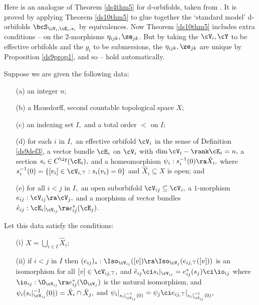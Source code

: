 \documentclass{article}
\begin{document}
Here is an analogue of Theorem \ref{ds4thm5} for d-orbifolds, taken
from \cite[\S 10.2]{Joyc6}. It is proved by applying Theorem
\ref{ds10thm5} to glue together the `standard model' d-orbifolds
$\bcS_{\cV_i,\cE_i,s_i}$ by equivalences. Now Theorem \ref{ds10thm5}
includes extra conditions -- on the
2-morphisms $\eta_{ijk},\ze_{jk}$. But by taking the $\cV_i,\cY$ to
be effective orbifolds and the $g_i$ to be submersions, the
$\eta_{ijk},\ze_{jk}$ are unique by Proposition \ref{ds9prop1}, and
so -- hold
automatically.

\begin{thm} Suppose we are given the following data:
\begin{itemize}
\setlength{\itemsep}{0pt}
\setlength{\parsep}{0pt}
\item[{\rm(a)}] an integer $n;$
\item[{\rm(b)}] a Hausdorff, second countable topological space $X;$
\item[{\rm(c)}] an indexing set\/ $I,$ and a total order $<$ on $I;$
\item[{\rm(d)}] for each\/ $i$ in $I,$ an effective orbifold\/
$\cV_i$ in the sense of Definition\/ {\rm\ref{ds9def3},} a
vector bundle $\cE_i$ on $\cV_i$ with\/
$\dim\cV_i-\rank\cE_i=n,$ a section $s_i\in C^\iy(\cE_i),$ and a
homeomorphism $\psi_i:s_i^{-1}(0) \ra\hat X_i,$ where
$s_i^{-1}(0)=\{[v_i]\in\cV_{i,\top}:s_i(v_i)=0\}$ and\/ $\hat
X_i\subseteq X$ is open; and
\item[{\rm(e)}] for all\/ $i<j$ in $I,$ an open suborbifold\/
$\cV_{ij}\subseteq\cV_i,$ a $1$-morphism
$e_{ij}:\cV_{ij}\ra\cV_j,$ and a morphism of vector bundles
$\hat e_{ij}:\cE_i\vert_{\cV_{ij}}\ra e_{ij}^*(\cE_j)$.
\end{itemize}
Let this data satisfy the conditions:
\begin{itemize}
\setlength{\itemsep}{0pt}
\setlength{\parsep}{0pt}
\item[{\rm(i)}] $X=\bigcup_{i\in I}\hat X_i;$
\item[{\rm(ii)}] if\/ $i<j$ in $I$ then $(e_{ij})_*:
\Iso_{\cV_{ij}}([v])\ra\Iso_{\cV_j}(e_{ij,\top}([v]))$ is an
isomorphism for all\/ $[v]\in\cV_{ij,\top},$ and\/ $\hat
e_{ij}\ci s_i\vert_{\cV_{ij}}=e_{ij}^*(s_j)\ci\io_{ij}$ where
$\io_{ij}:\O_{\cV_{ij}}\ra e_{ij}^*(\O_{\cV_j})$ is the natural
isomorphism, and\/ $\psi_i(s_i\vert_{\cV_{ij}}^{-1}(0))=\hat
X_i\cap\hat X_j,$ and\/ $\psi_i\vert_{s_i\vert_{\cV_{ij}}^{-1}
(0)}=\psi_j\ci e_{ij,\top}\vert_{s_i\vert_{\cV_{ij}}^{-1}(0)},$

\end{itemize}
\end{thm}
\end{document}
